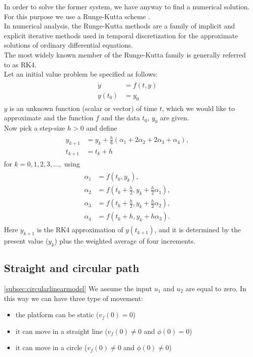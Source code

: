 In order to solve the former system, we have anyway to find a numerical solution. For this purpose we use a    
Runge-Kutta scheme  \cite{wiki_runge_kutta}.\\
In numerical analysis, the Runge-Kutta methods are a family of implicit and explicit iterative methods used in temporal discretization for the approximate solutions of ordinary differential equations.\\
The most widely known member of the Runge-Kutta family is generally referred to as RK4.\\
Let an initial value problem be specified as follows:
\begin{align}
\begin{split}
{\dot {y}}&=f(t,y) \\
y(t_{0})&=y_{0}
\end{split}
\end{align}
$y$ is an unknown function (scalar or vector) of time $t$, which we would like to approximate and the function $f$ and the data $t_{0}$, $y_{0}$ are given.\\
Now pick a step-size $h > 0$ and define
\begin{align}
\begin{split}
y_{k+1}&=y_{k}+{\tfrac {h}{6}}\left(\alpha_{1}+2\alpha_{2}+2\alpha_{3}+\alpha_{4}\right),\\
t_{k+1}&=t_{k}+h
\end{split}
\end{align}
for $k = 0, 1, 2, 3, ...,$ using
\begin{align}
\begin{split}
\alpha_{1}&=f(t_{k},y_{k}),\\
\alpha_{2}&=f(t_{k}+{\frac {h}{2}},y_{k}+{\frac {h}{2}}\alpha_{1}),\\
\alpha_{3}&=f(t_{k}+{\frac {h}{2}},y_{k}+{\frac {h}{2}}\alpha_{2}),\\
\alpha_{4}&=f(t_{k}+h,y_{k}+h\alpha_{3}).
\end{split}
\end{align}
Here  $y_{k+1}$ is the RK4 approximation of $y(t_{k+1})$, and it is determined by the present value ($y_{k}$) plus the weighted average of four increments.

\subsection{Straight and circular path} \ref{subsec:circularlinearmodel}
We assume the input $u_1$ and $u_2$  are equal to zero. In this way we can have three type of movement:
\begin{itemize}
\item the platform can be static ($v_f(0) = 0$)
\item it can move in a straight line ($v_f(0) \neq 0$ and $\phi(0) = 0$)
\item it can move in a circle ($v_f(0) \neq 0$ and $\phi(0) \neq 0$)
\end{itemize}

